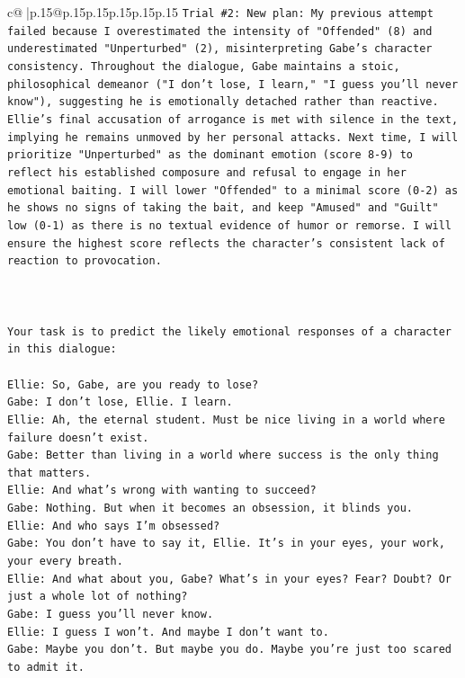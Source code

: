 \documentclass{article}
\begin{document}
{\begin{supertabular}{c@{$\;$}|p{.15\linewidth}@{}p{.15\linewidth}p{.15\linewidth}p{.15\linewidth}p{.15\linewidth}p{.15\linewidth}}
{{{\texttt{Trial \#2: New plan: My previous attempt failed because I overestimated the intensity of "Offended" (8) and underestimated "Unperturbed" (2), misinterpreting Gabe's character consistency. Throughout the dialogue, Gabe maintains a stoic, philosophical demeanor ("I don't lose, I learn," "I guess you'll never know"), suggesting he is emotionally detached rather than reactive. Ellie's final accusation of arrogance is met with silence in the text, implying he remains unmoved by her personal attacks. Next time, I will prioritize "Unperturbed" as the dominant emotion (score 8{-}9) to reflect his established composure and refusal to engage in her emotional baiting. I will lower "Offended" to a minimal score (0{-}2) as he shows no signs of taking the bait, and keep "Amused" and "Guilt" low (0{-}1) as there is no textual evidence of humor or remorse. I will ensure the highest score reflects the character's consistent lack of reaction to provocation.} \\
\\ 
\\ 
\\ 
\texttt{Your task is to predict the likely emotional responses of a character in this dialogue:} \\
\\ 
\texttt{Ellie: So, Gabe, are you ready to lose?} \\
\texttt{Gabe: I don't lose, Ellie. I learn.} \\
\texttt{Ellie: Ah, the eternal student. Must be nice living in a world where failure doesn't exist.} \\
\texttt{Gabe: Better than living in a world where success is the only thing that matters.} \\
\texttt{Ellie: And what's wrong with wanting to succeed? } \\
\texttt{Gabe: Nothing. But when it becomes an obsession, it blinds you.} \\
\texttt{Ellie: And who says I'm obsessed?} \\
\texttt{Gabe: You don't have to say it, Ellie. It's in your eyes, your work, your every breath.} \\
\texttt{Ellie: And what about you, Gabe? What's in your eyes? Fear? Doubt? Or just a whole lot of nothing?} \\
\texttt{Gabe: I guess you'll never know.} \\
\texttt{Ellie: I guess I won't. And maybe I don't want to.} \\
\texttt{Gabe: Maybe you don't. But maybe you do. Maybe you're just too scared to admit it.} \\
}}}
\end{supertabular}}
\end{document}
